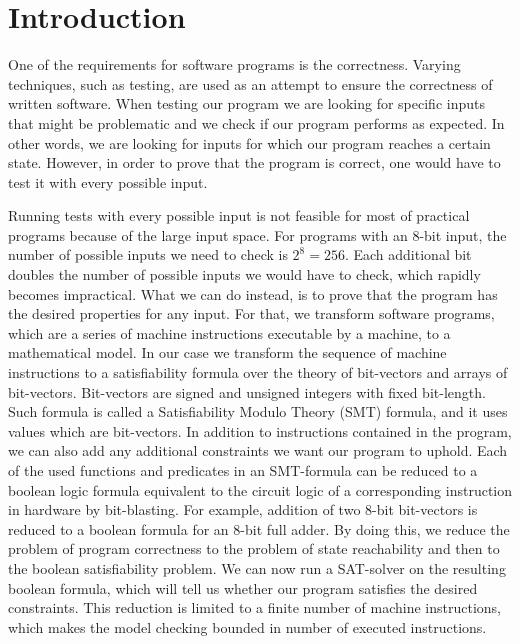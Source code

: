 \documentclass[12pt]{article}
\begin{document}

\newpage
\tableofcontents
\newpage


\section{Introduction}

One of the requirements for software programs is the correctness. Varying
techniques, such as testing, are used as an attempt to ensure the correctness
of written software. When testing our program we are looking for specific
inputs that might be problematic and we check if our program performs as
expected. In other words, we are looking for inputs for which our program
reaches a certain state. However, in order to prove that the program is
correct, one would have to test it with every possible input.

Running tests with every possible input is not feasible for most of practical
programs because of the large input space. For programs with an 8-bit input,
the number of possible inputs we need to check is $2^8 = 256$. Each additional
bit doubles the number of possible inputs we would have to check, which rapidly
becomes impractical. What we can do instead, is to prove that the program has
the desired properties for any input. For that, we transform software programs,
which are a series of machine instructions executable by a machine, to a
mathematical model. In our case we transform the sequence of machine
instructions to a satisfiability formula over the theory of bit-vectors and
arrays of bit-vectors. Bit-vectors are signed and unsigned integers with fixed
bit-length. Such formula is called a Satisfiability Modulo Theory (SMT)
formula, and it uses values which are bit-vectors. In addition to instructions
contained in the program, we can also add any additional constraints we want
our program to uphold. Each of the used functions and predicates in an
SMT-formula can be reduced to a boolean logic formula equivalent to the circuit
logic of a corresponding instruction in hardware by bit-blasting. For example, 
addition of two 8-bit bit-vectors is reduced to a boolean formula for an 8-bit
full adder. By doing this, we reduce the problem of program correctness to the
problem of state reachability and then to the boolean satisfiability problem.
We can now run a SAT-solver on the resulting boolean formula, which will tell
us whether our program satisfies the desired constraints. This reduction is
limited to a finite number of machine instructions, which makes the model
checking bounded in number of executed instructions.
\end{document}

